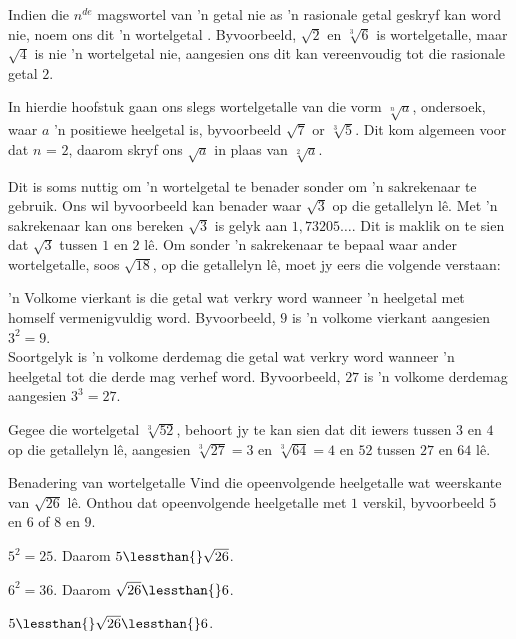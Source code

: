 Indien die $n^{de}$ magswortel van ’n getal nie as ’n rasionale getal geskryf kan word nie,  noem ons dit ’n wortelgetal . Byvoorbeeld, $\sqrt{2}$ en $\sqrt[3]{6}$ is wortelgetalle, maar $\sqrt{4}$ is nie ’n wortelgetal nie, aangesien ons dit kan vereenvoudig tot die rasionale getal $2$.\par 
In hierdie hoofstuk gaan ons slegs wortelgetalle van die vorm $\sqrt[n]{a}$, ondersoek, waar  $a$ ’n positiewe heelgetal is, byvoorbeeld $\sqrt{7}$ or $\sqrt[3]{5}$. Dit kom algemeen voor dat $n$ = $2$, daarom skryf ons $\sqrt{a}$ in plaas van $\sqrt[2]{a}$.\par 
Dit is soms nuttig om ’n wortelgetal te benader sonder om ’n sakrekenaar te gebruik. Ons wil byvoorbeeld kan benader waar $\sqrt{3}$ op die getallelyn lê. Met ’n sakrekenaar kan ons bereken $\sqrt{3}$ is gelyk aan $1,73205\ldots$. Dit is maklik on te sien dat $\sqrt{3}$ tussen $1$ en $2$ lê. Om sonder ’n sakrekenaar te bepaal waar ander wortelgetalle, soos $\sqrt{18}$, op die getallelyn lê, moet jy eers die volgende verstaan:\par 


      
’n Volkome vierkant is die getal wat verkry word wanneer ’n heelgetal met homself vermenigvuldig word. Byvoorbeeld, $9$  is ’n volkome vierkant aangesien ${3}^{2}=9$. \\
Soortgelyk is ’n volkome derdemag die getal wat verkry word wanneer ’n heelgetal
tot die derde mag verhef word. Byvoorbeeld, $27$ is ’n volkome derdemag aangesien ${3}^{3}=27$.
\par 
Gegee die wortelgetal $\sqrt[3]{52}$, behoort jy te kan sien dat dit iewers tussen $3$ en $4$ op die getallelyn lê, aangesien $\sqrt[3]{27}=3$ en $\sqrt[3]{64}=4$ en $52$ tussen $27$ en $64$ lê.


\begin{wex}{Benadering van wortelgetalle}
{
Vind die opeenvolgende heelgetalle wat weerskante van $\sqrt{26}$ lê.
Onthou dat opeenvolgende heelgetalle met $1$ verskil, byvoorbeeld $5$ en $6$ of $8$ en $9$.
}
{
           
${5}^{2}=25$. Daarom $5\lessthan{}\sqrt{26}$.

${6}^{2}=36$. 
Daarom $\sqrt{26}\lessthan{}6$.

$5\lessthan{}\sqrt{26}\lessthan{}6$. 
}
\end{wex}


